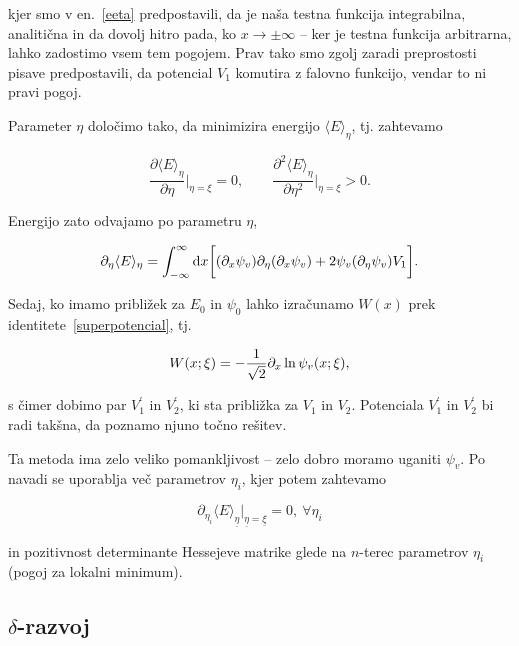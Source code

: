 kjer smo v en.~\eqref{eeta} predpostavili, da je na\v sa testna funkcija integrabilna, analiti\v cna in da dovolj hitro pada, ko
$x \to \pm \infty$ -- ker je testna funkcija arbitrarna, lahko zadostimo vsem tem pogojem. Prav tako smo zgolj zaradi preprostosti
pisave predpostavili, da potencial $V_1$ komutira z falovno funkcijo, vendar to ni pravi pogoj.

Parameter $\eta$ dolo\v cimo tako, da minimizira energijo $\langle E \rangle_\eta$, tj. zahtevamo

\begin{equation}
	\frac{\partial \langle E \rangle_\eta}{\partial\eta}\bigg|_{\eta = \xi} = 0, \qquad
	\frac{\partial^2 \langle E \rangle_\eta}{\partial\eta^2}\bigg|_{\eta = \xi} > 0.
\end{equation}

Energijo zato odvajamo po parametru $\eta$,

\begin{equation}
	\partial_\eta\langle E\rangle_\eta = \int_{-\infty}^\infty\text{d} x\bigg[(\partial_x \psi_v) \partial_\eta (\partial_x \psi_v) +  2 \psi_v (\partial_\eta \psi_v) V_1\bigg].
\end{equation}

Sedaj, ko imamo pribli\v zek za $E_0$ in $\psi_0$ lahko izra\v cunamo $W(x)$ prek identitete~\eqref{superpotencial}, tj.

\begin{equation}
	W (x; \xi) = -\frac{1}{\sqrt{2}}\partial_x\ln\psi_v (x;\xi),
\end{equation}

s \v cimer dobimo par $V_1^\prime$ in $V_2^\prime$, ki sta pribli\v zka za $V_1$ in $V_2$. Potenciala $V_1^\prime$ in $V_2^\prime$
bi radi tak\v sna, da poznamo njuno to\v cno re\v sitev.

Ta metoda ima zelo veliko pomankljivost -- zelo dobro moramo uganiti $\psi_v$. Po navadi se uporablja ve\v c parametrov $\eta_i$, kjer
potem zahtevamo

\begin{equation}
	\partial_{\eta_i} \langle E \rangle_{\underline\eta}\Big|_{\underline{\eta} = \underline{\xi}} = 0, \ \forall \eta_i
\end{equation}

in pozitivnost determinante Hessejeve matrike glede na $n$-terec parametrov $\eta_i$ (pogoj za lokalni minimum).

\subsection{$\delta$-razvoj}

